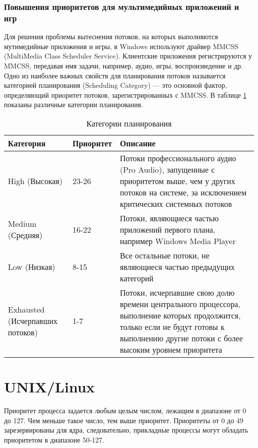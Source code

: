 \subsubsection*{Повышения приоритетов для мультимедийных приложений и игр}

Для решения проблемы вытеснения потоков, на которых выполняются мутимедийные приложения и игры, в Windows используют драйвер MMCSS (MultiMedia Class Scheduler Service). 
Клиентские приложения регистрируются у MMCSS, передавая имя задачи, например, аудио, игры, воспроизведение и др.  
Одно из наиболее важных свойств для планирования потоков называется категорией планирования (Scheduling Category) --- это основной фактор, определяющий приоритет потоков, зарегистрированных с MMCSS.
В таблице \ref{tbl:plan} показаны различные категории планирования.


\begin{table}[ht]
	\centering
	\begin{threeparttable}
		\caption{Категории планирования}
		\label{tbl:plan}
		\begin{tabularx}{\textwidth}{|X|X|p{80mm}|}
			\hline
			\bfseries Категория & \bfseries Приоритет & \bfseries Описание \\
			\hline
			High (Высокая) & 23-26 & Потоки профессионального аудио (Pro Audio), запущенные с приоритетом выше, чем у других потоков на системе, за исключением критических системных потоков \\
			\hline
			Medium (Средняя) & 16-22 & Потоки, являющиеся частью приложений первого плана, например Windows Media Player \\
			\hline
			Low (Низкая) & 8-15 & Все остальные потоки, не являющиеся частью предыдущих категорий \\
			\hline
			Exhausted (Исчерпавших потоков) & 1-7 & Потоки, исчерпавшие свою долю времени центрального процессора, выполнение которых продолжится, только если не будут готовы к выполнению другие потоки с более высоким уровнем приоритета \\
			\hline
		\end{tabularx}
	\end{threeparttable}
\end{table}

\clearpage

\section{UNIX/Linux}

Приоритет процесса задается любым целым числом, лежащим в диапазоне от 0 до 127. Чем меньше такое число, тем выше приоритет. Приоритеты от 0 до 49 зарезервированы для ядра, следовательно, прикладные процессы могут обладать приоритетом в диапазоне 50-127. 

